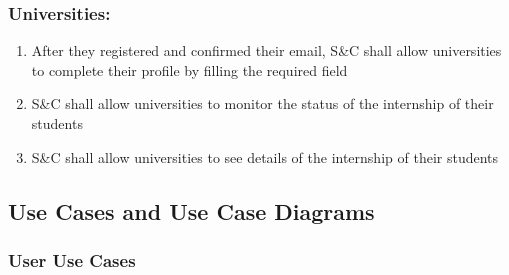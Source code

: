         \subsubsection*{Universities:}
        \begin{enumerate}[label=\textbf{R\arabic*},resume]
            \item After they registered and confirmed their email, S\&C shall allow universities to complete their profile by filling the required field
            \item S\&C shall allow universities to monitor the status of the internship of their students
            \item S\&C shall allow universities to see details of the internship of their students
        \end{enumerate}
        
\newpage

\subsection{Use Cases and Use Case Diagrams}

    \subsubsection{User Use Cases}
    
